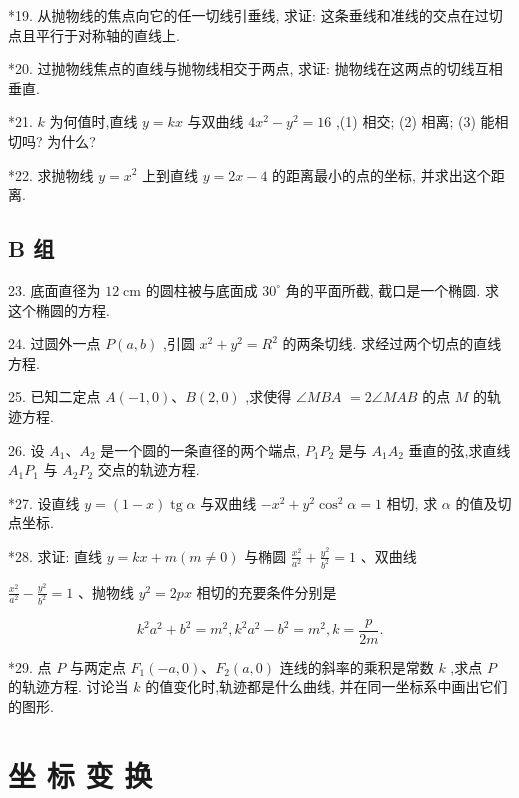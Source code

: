 \documentclass[lang=cn,newtx,10.5pt,scheme=chinese]{elegantbook}
\begin{document}
*19. 从抛物线的焦点向它的任一切线引垂线, 求证: 这条垂线和准线的交点在过切点且平行于对称轴的直线上.

*20. 过抛物线焦点的直线与抛物线相交于两点, 求证: 抛物线在这两点的切线互相垂直.

*21. \(k\) 为何值时,直线 \(y = {kx}\) 与双曲线 \(4{x}^{2} - {y}^{2} = {16}\) ,(1) 相交; (2) 相离; (3) 能相切吗? 为什么?

*22. 求抛物线 \(y = {x}^{2}\) 上到直线 \(y = {2x} - 4\) 的距离最小的点的坐标, 并求出这个距离.

\section*{B 组}

23. 底面直径为 \({12}\mathrm{\;{cm}}\) 的圆柱被与底面成 \({30}^{ \circ }\) 角的平面所截, 截口是一个椭圆. 求这个椭圆的方程.

24. 过圆外一点 \(P\left( {a,b}\right)\) ,引圆 \({x}^{2} + {y}^{2} = {R}^{2}\) 的两条切线. 求经过两个切点的直线方程.

25. 已知二定点 \(A\left( {-1,0}\right) \text{、}B\left( {2,0}\right)\) ,求使得 \(\angle {MBA}\) \(= 2\angle {MAB}\) 的点 \(M\) 的轨迹方程.

26. 设 \({A}_{1}\text{、}{A}_{2}\) 是一个圆的一条直径的两个端点, \({P}_{1}{P}_{2}\) 是与 \({A}_{1}{A}_{2}\) 垂直的弦,求直线 \({A}_{1}{P}_{1}\) 与 \({A}_{2}{P}_{2}\) 交点的轨迹方程.

*27. 设直线 \(y = \left( {1 - x}\right) \operatorname{tg}\alpha\) 与双曲线 \(- {x}^{2} + {y}^{2}{\cos }^{2}\alpha = 1\) 相切, 求 \(\alpha\) 的值及切点坐标.

*28. 求证: 直线 \(y = {kx} + m\left( {m \neq 0}\right)\) 与椭圆 \(\frac{{x}^{2}}{{a}^{2}} + \frac{{y}^{2}}{{b}^{2}} = 1\) 、双曲线

\(\frac{{x}^{2}}{{a}^{2}} - \frac{{y}^{2}}{{b}^{2}} = 1\) 、抛物线 \({y}^{2} = {2px}\) 相切的充要条件分别是

\[
    {k}^{2}{a}^{2} + {b}^{2} = {m}^{2},{k}^{2}{a}^{2} - {b}^{2} = {m}^{2},k = \frac{p}{2m}.
\]

*29. 点 \(P\) 与两定点 \({F}_{1}\left( {-a,0}\right) \text{、}{F}_{2}\left( {a,0}\right)\) 连线的斜率的乘积是常数 \(k\) ,求点 \(P\) 的轨迹方程. 讨论当 \(k\) 的值变化时,轨迹都是什么曲线, 并在同一坐标系中画出它们的图形.

\chapter{坐 标 变 换}
\end{document}
